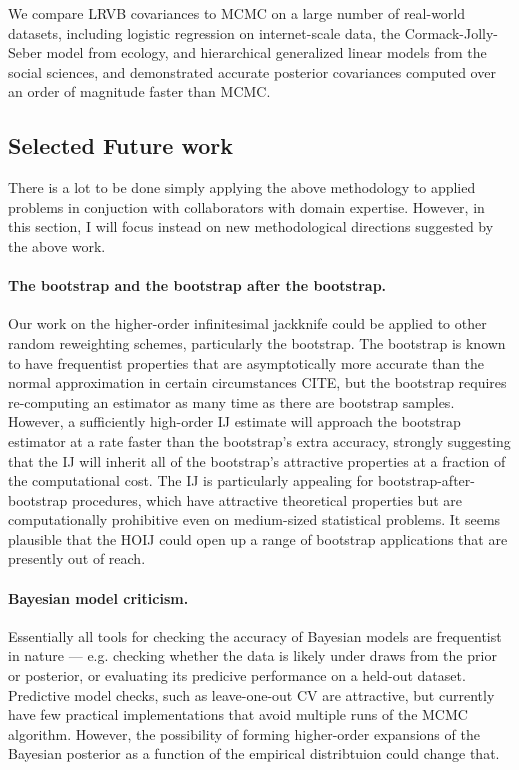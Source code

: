 We compare LRVB covariances to MCMC on a large number of real-world datasets,
including logistic regression on internet-scale data, the Cormack-Jolly-Seber
model from ecology, and hierarchical generalized linear models from the
social sciences, and demonstrated accurate posterior covariances computed
over an order of magnitude faster than MCMC.


\subsection*{Selected Future work}

There is a lot to be done simply applying the above methodology to
applied problems in conjuction with collaborators with domain expertise.
However, in this section, I will focus instead on new methodological directions
suggested by the above work.

\paragraph{The bootstrap and the bootstrap after the bootstrap.}

Our work on the higher-order infinitesimal jackknife could be applied to other
random reweighting schemes, particularly the bootstrap.  The bootstrap is known
to have frequentist properties that are asymptotically more accurate than the
normal approximation in certain circumstances CITE, but the bootstrap requires
re-computing an estimator as many time as there are bootstrap samples. However,
a sufficiently high-order IJ estimate will approach the bootstrap estimator at a
rate faster than the bootstrap's extra accuracy, strongly suggesting that the IJ
will inherit all of the bootstrap's attractive properties at a fraction of the
computational cost.  The IJ is particularly appealing for
bootstrap-after-bootstrap procedures, which have attractive theoretical
properties but are computationally prohibitive even on medium-sized statistical
problems.  It seems plausible that the HOIJ could open up a range of bootstrap
applications that are presently out of reach.


\paragraph{Bayesian model criticism.}

Essentially all tools for checking the accuracy of Bayesian models are
frequentist in nature --- e.g. checking whether the data is likely under
draws from the prior or posterior, or evaluating its predicive performance
on a held-out dataset.  Predictive model checks, such as leave-one-out
CV are attractive, but currently have few practical implementations that
avoid multiple runs of the MCMC algorithm.  However, the possibility of
forming higher-order expansions of the Bayesian posterior as a function of
the empirical distribtuion could change that.


